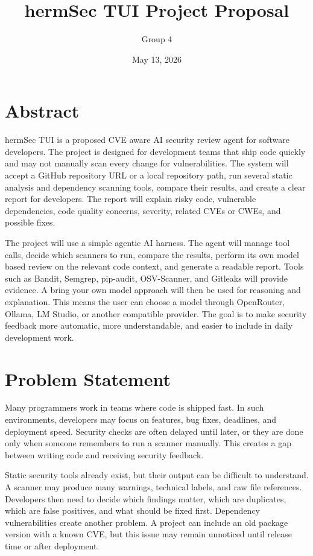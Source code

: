 \documentclass[
    numbers=noenddot,
    parskip=half-,
    fontsize=11pt,
    paper=a4,
    oneside,
    titlepage,
    bibliography=totoc,
    chapterprefix=false
]{scrbook}
\title{hermSec TUI Project Proposal}
\author{Group 4}
\date{May 13, 2026}
\begin{document}
\frontmatter


\tableofcontents
\newpage

\chapter*{Abstract}
hermSec TUI is a proposed CVE aware AI security review agent for software developers. The project is designed for development teams that ship code quickly and may not manually scan every change for vulnerabilities. The system will accept a GitHub repository URL or a local repository path, run several static analysis and dependency scanning tools, compare their results, and create a clear report for developers. The report will explain risky code, vulnerable dependencies, code quality concerns, severity, related CVEs or CWEs, and possible fixes.

The project will use a simple agentic AI harness. The agent will manage tool calls, decide which scanners to run, compare the results, perform its own model based review on the relevant code context, and generate a readable report. Tools such as Bandit, Semgrep, pip-audit, OSV-Scanner, and Gitleaks will provide evidence. A bring your own model approach will then be used for reasoning and explanation. This means the user can choose a model through OpenRouter, Ollama, LM Studio, or another compatible provider. The goal is to make security feedback more automatic, more understandable, and easier to include in daily development work.

\mainmatter

\chapter{Problem Statement}

Many programmers work in teams where code is shipped fast. In such environments, developers may focus on features, bug fixes, deadlines, and deployment speed. Security checks are often delayed until later, or they are done only when someone remembers to run a scanner manually. This creates a gap between writing code and receiving security feedback.

Static security tools already exist, but their output can be difficult to understand. A scanner may produce many warnings, technical labels, and raw file references. Developers then need to decide which findings matter, which are duplicates, which are false positives, and what should be fixed first. Dependency vulnerabilities create another problem. A project can include an old package version with a known CVE, but this issue may remain unnoticed until release time or after deployment.
\end{document}

